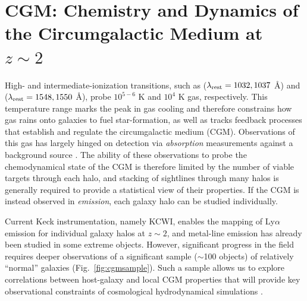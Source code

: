 \documentclass[11pt,a4paper,twoside,onecolumn,openany,final,oldfontcommands]{memoir}
\begin{document}



\section{CGM: Chemistry and Dynamics of the Circumgalactic Medium at $z\sim2$}

High- and intermediate-ionization transitions, such as  ($\lambda_{\rm rest} = 1032, 1037$ \AA) and  ($\lambda_{\rm rest} = 1548, 1550$ \AA), probe $10^{5-6}$ K and $10^4$ K gas, respectively.  This temperature range marks the peak in gas cooling and therefore constrains how gas rains onto galaxies to fuel star-formation, as well as tracks feedback processes that establish and regulate the circumgalactic medium (CGM).  Observations of this gas has largely hinged on detection via \textit{absorption} measurements against a background source .  The ability of these observations to probe the chemodynamical state of the CGM is therefore limited by the number of viable targets through each halo, and stacking of sightlines through many halos is generally required to provide a statistical view of their properties.  If the CGM is instead observed in \textit{emission}, each galaxy halo can be studied individually.

Current Keck instrumentation, namely KCWI, enables the mapping of Ly$\alpha$ emission for individual galaxy halos at $z\sim2$, and metal-line emission has already been studied in some extreme objects. However, significant progress in the field requires deeper observations of a significant sample ($\sim$100 objects) of relatively ``normal'' galaxies (Fig.~\ref{fig:cgmsample}).  Such a sample allows us to explore correlations between host-galaxy and local CGM properties that will provide key observational constraints of cosmological hydrodynamical simulations .
\end{document}
